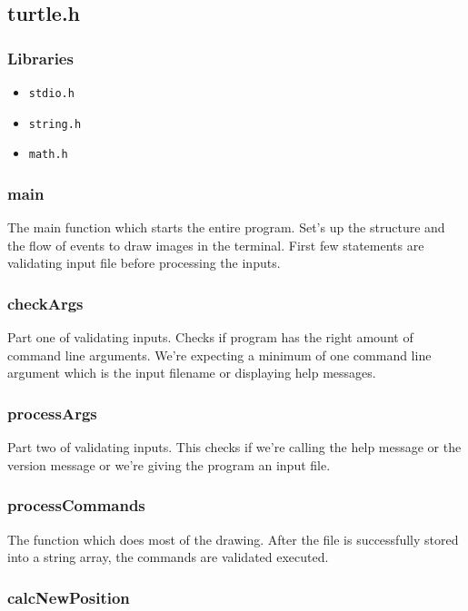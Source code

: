 \documentclass[a4paper, 12pt, titlepage]{article}
\newcommand{\code}[1]{\small\texttt{#1}\normalsize}
\begin{document}
\subsection{turtle.h}
\subsubsection{Libraries}

\begin{itemize}[label={--}, noitemsep]
    \item \code{stdio.h}
    \item \code{string.h}
    \item \code{math.h}
\end{itemize}

\subsubsection{main}

The main function which starts the entire program. Set's up the structure 
and the flow of events to draw images in the terminal. First few statements 
are validating input file before processing the inputs.

\subsubsection{checkArgs}

Part one of validating inputs. Checks if program has the right amount of 
command line arguments. We're expecting a minimum of one command line 
argument which is the input filename or displaying help messages.

\subsubsection{processArgs}

Part two of validating inputs. This checks if we're calling the help message 
or the version message or we're giving the program an input file.

\subsubsection{processCommands}

The function which does most of the drawing. After the file is successfully 
stored into a string array, the commands are validated executed.

\subsubsection{calcNewPosition}
\end{document}
